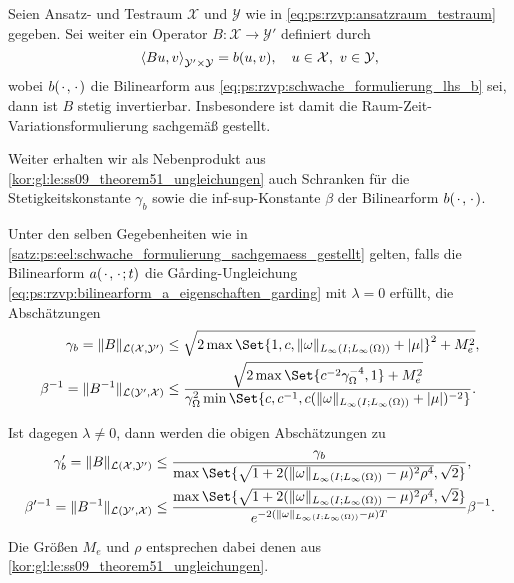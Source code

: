 \begin{Korollar}
\label{satz:ps:eel:schwache_formulierung_sachgemaess_gestellt}
    Seien Ansatz- und Testraum $\mathcal X$ und $\mathcal Y$ wie in \cref{eq:ps:rzvp:ansatzraum_testraum} gegeben.
    Sei weiter ein Operator $B \colon \mathcal X \to \mathcal Y'$ definiert durch
    \begin{equation}
        \left\langle Bu,v\right\rangle_{\mathcal Y' \times \mathcal Y}  = b(u, v), \quad u \in \mathcal X,~ v \in \mathcal Y,
    \end{equation}
    wobei $b({\mkern2mu\cdot\mkern2mu}, {\mkern2mu\cdot\mkern2mu})$ die Bilinearform aus \cref{eq:ps:rzvp:schwache_formulierung_lhs_b} sei,
    dann ist $B$ stetig invertierbar.
    Insbesondere ist damit die Raum-Zeit-Variationsformulierung sachgemäß gestellt.
\end{Korollar}

Weiter erhalten wir als Nebenprodukt aus \cref{kor:gl:le:ss09_theorem51_ungleichungen} auch Schranken für die Stetigkeitskonstante $\gamma_{b}$ sowie die inf-sup-Konstante $\beta$ der Bilinearform $b({\mkern2mu\cdot\mkern2mu}, {\mkern2mu\cdot\mkern2mu})$.

\begin{Korollar}
\label{kor:ps:eel:schwache_formulierung_operator_schranken}
    Unter den selben Gegebenheiten wie in \cref{satz:ps:eel:schwache_formulierung_sachgemaess_gestellt} gelten, falls die Bilinearform $a({\mkern2mu\cdot\mkern2mu}, {\mkern2mu\cdot\mkern2mu};t)$ die G\aa{}rding-Ungleichung \cref{eq:ps:rzvp:bilinearform_a_eigenschaften_garding} mit $\lambda = 0$ erfüllt, die Abschätzungen
    \begin{align}
        \gamma_{b} = \norm{B}_{\mathcal L(\mathcal X, \mathcal Y')} &\leq \sqrt{2 \max\Set{ 1, c, \norm{\omega}_{L_{\infty}(I; L_{\infty}(\Omega))} + \abs{\mu} }^{2} + M_{e}^{2} }, \\
        \beta^{-1} = \norm{B^{-1}}_{\mathcal L(\mathcal Y', \mathcal X)} &\leq \frac{\sqrt{2 \max\Set{c^{-2}\gamma_{\Omega}^{-4}, 1} + M_{e}^{2}}}{\gamma_{\Omega}^{2} \min\Set{c, c^{-1}, c (\norm{\omega}_{L_{\infty}(I; L_{\infty}(\Omega))} + \abs{\mu})^{-2}}}.
    \end{align}

    Ist dagegen $\lambda \neq 0$, dann werden die obigen Abschätzungen zu
    \begin{align}
        \gamma'_{b} = \norm{B}_{\mathcal L(\mathcal X, \mathcal Y')} &\leq \frac{\gamma_{b}}{\max\Set{\sqrt{1 + 2 (\norm{\omega}_{L_{\infty}(I; L_{\infty}(\Omega))} - \mu)^{2} \rho^{4} }, \sqrt{2}}}, \\
        \beta'^{-1} = \norm{B^{-1}}_{\mathcal L(\mathcal Y', \mathcal X)} &\leq \frac{\max\Set{\sqrt{1 + 2 (\norm{\omega}_{L_{\infty}(I; L_{\infty}(\Omega))} - \mu)^{2} \rho^{4} }, \sqrt{2}}}{e^{-2(\norm{\omega}_{L_{\infty}(I; L_{\infty}(\Omega))} - \mu) T}} \beta^{-1}.
    \end{align}

    Die Größen $M_{e}$ und $\rho$ entsprechen dabei denen aus \cref{kor:gl:le:ss09_theorem51_ungleichungen}.
\end{Korollar}

